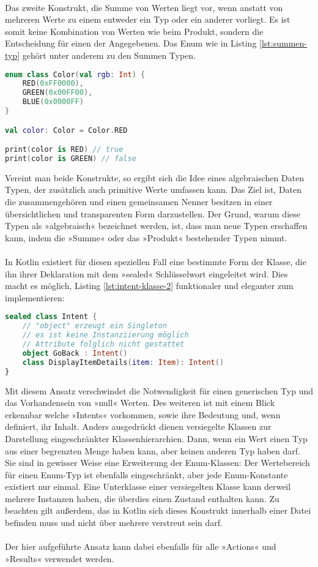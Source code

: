 \\
Das zweite Konstrukt, die Summe von Werten liegt vor, wenn anstatt von mehreren Werte zu einem entweder ein Typ oder ein anderer vorliegt. Es ist somit keine Kombination von Werten wie beim Produkt, sondern die Entscheidung für einen der Angegebenen. Das Enum wie in Listing
\ref{lst:summen-typ}
gehört unter anderem zu den Summen Typen.
\begin{lstlisting}[caption={Summen Typ}, label={lst:summen-typ}, language=Kotlin]
enum class Color(val rgb: Int) {
	RED(0xFF0000),
	GREEN(0x00FF00),
	BLUE(0x0000FF)
}

val color: Color = Color.RED

print(color is RED) // true
print(color is GREEN) // false
\end{lstlisting}
\bigskip
Vereint man beide Konstrukte, so ergibt sich die Idee eines algebraischen Daten Typen, der zusätzlich 
auch primitive Werte umfassen kann. Das Ziel ist, Daten die zusammengehören und einen gemeinsamen Nenner 
besitzen in einer übersichtlichen und transparenten Form darzustellen. Der Grund, warum diese Typen als 
»algebraisch« bezeichnet werden, ist, dass man neue Typen erschaffen kann, indem die »Summe« oder das 
»Produkt« bestehender Typen nimmt.
\\
\\
In Kotlin existiert für diesen speziellen Fall eine bestimmte Form der Klasse, die ihn ihrer Deklaration mit dem »sealed« Schlüsselwort eingeleitet wird. Dies macht es möglich, Listing 
\ref{lst:intent-klasse-2}
funktionaler und eleganter zum implementieren:
\begin{lstlisting}[caption={Intents als sealded class}, label={lst:intents-sealed-class}, language=Kotlin]
sealed class Intent {
	// "object" erzeugt ein Singleton
	// es ist keine Instanziierung möglich
	// Attribute folglich nicht gestattet
	object GoBack : Intent()
	class DisplayItemDetails(item: Item): Intent()
}
\end{lstlisting}
\bigskip
Mit diesem Ansatz verschwindet die Notwendigkeit für einen generischen Typ und das Vorhandensein von 
»null« Werten. Des weiteren ist mit einem Blick erkennbar welche »Intents« vorkommen, sowie ihre Bedeutung und, wenn definiert, ihr Inhalt. Anders ausgedrückt dienen versiegelte Klassen zur Darstellung 
eingeschränkter Klassenhierarchien. Dann, wenn ein Wert einen Typ aus einer begrenzten Menge haben kann, 
aber keinen anderen Typ haben darf. Sie sind in gewisser Weise eine Erweiterung der Enum-Klassen: Der 
Wertebereich für einen Enum-Typ ist ebenfalls eingeschränkt, aber jede Enum-Konstante existiert nur 
einmal. Eine Unterklasse einer versiegelten Klasse kann derweil mehrere Instanzen haben, die überdies 
einen Zustand enthalten kann. Zu beachten gilt außerdem, das in Kotlin sich dieses Konstrukt innerhalb einer Datei befinden muss und nicht über mehrere verstreut sein darf.
\\\\
Der hier aufgeführte Ansatz kann dabei ebenfalls für alle »Actions« und »Results« verwendet werden.
